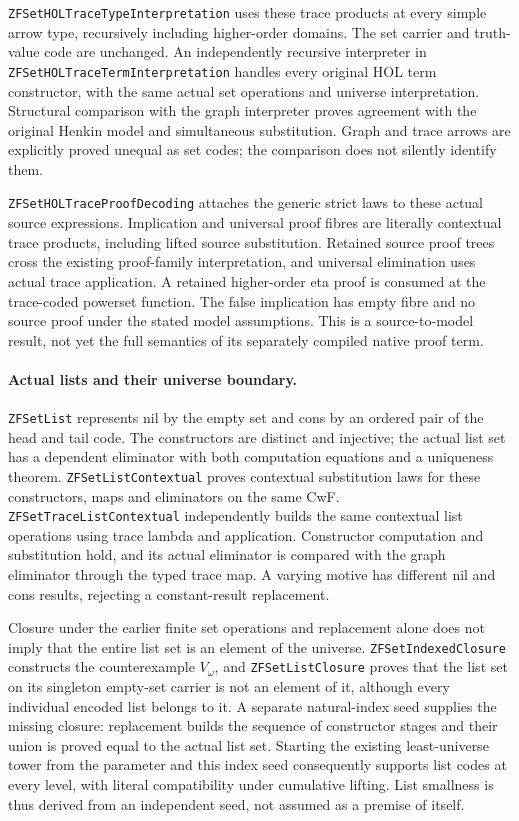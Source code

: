 \documentclass[11pt]{article}
\theoremstyle{definition}
\theoremstyle{remark}
\begin{document}
\nolinkurl{ZFSetHOLTraceTypeInterpretation} uses these trace products
at every simple arrow type, recursively including higher-order domains.
The set carrier and truth-value code are unchanged. An independently
recursive interpreter in \nolinkurl{ZFSetHOLTraceTermInterpretation}
handles every original HOL term constructor, with the same actual set
operations and universe interpretation. Structural comparison with the
graph interpreter proves agreement with the original Henkin model and
simultaneous substitution. Graph and trace arrows are explicitly proved
unequal as set codes; the comparison does not silently identify them.

\nolinkurl{ZFSetHOLTraceProofDecoding} attaches the generic strict laws
to these actual source expressions. Implication and universal proof fibres
are literally contextual trace products, including lifted source
substitution. Retained source proof trees cross the existing proof-family
interpretation, and universal elimination uses actual trace application.
A retained higher-order eta proof is consumed at the trace-coded powerset
function. The false implication has empty fibre and no source proof under
the stated model assumptions. This is a source-to-model result, not yet
the full semantics of its separately compiled native proof term.

\paragraph{Actual lists and their universe boundary.}
\nolinkurl{ZFSetList} represents nil by the empty set and cons by an
ordered pair of the head and tail code. The constructors are distinct and
injective; the actual list set has a dependent eliminator with both
computation equations and a uniqueness theorem.
\nolinkurl{ZFSetListContextual} proves contextual substitution laws
for these constructors, maps and eliminators on the same CwF.
\nolinkurl{ZFSetTraceListContextual} independently builds the same
contextual list operations using trace lambda and application. Constructor
computation and substitution hold, and its actual eliminator is compared
with the graph eliminator through the typed trace map. A varying motive
has different nil and cons results, rejecting a constant-result replacement.

Closure under the earlier finite set operations and replacement alone
does not imply that the entire list set is an element of the universe.
\nolinkurl{ZFSetIndexedClosure} constructs the counterexample
\(V_\omega\), and \nolinkurl{ZFSetListClosure} proves that the list
set on its singleton empty-set carrier is not an element of it, although
every individual encoded list belongs to it. A separate natural-index
seed supplies the missing closure: replacement builds the sequence of
constructor stages and their union is proved equal to the actual list
set. Starting the existing least-universe tower from the parameter and
this index seed consequently supports list codes at every level, with
literal compatibility under cumulative lifting. List smallness is thus
derived from an independent seed, not assumed as a premise of itself.
\end{document}
